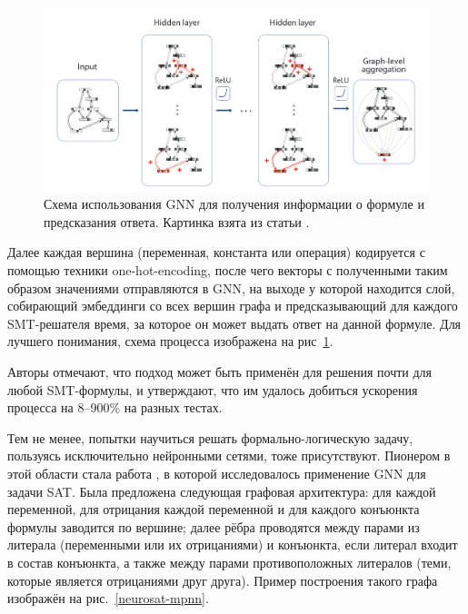 \begin{figure}[ht]
\begin{center}
    \includegraphics[scale=0.25]{./assets/gnn-for-scheduling-process.png}
    \caption{\label{gnn-for-scheduling-process} Схема использования GNN для получения информации о формуле и предсказания ответа. Картинка взята из статьи \cite{gnn-for-scheduling-paper}.}
\end{center}
\end{figure}

Далее каждая вершина (переменная, константа или операция) кодируется с помощью техники one-hot-encoding, после чего векторы с полученными таким образом значениями отправляются в GNN, на выходе у которой находится слой, собирающий эмбеддинги со всех вершин графа и предсказывающий для каждого SMT-решателя время, за которое он может выдать ответ на данной формуле. Для лучшего понимания, схема процесса изображена на рис~\ref{gnn-for-scheduling-process}.

Авторы отмечают, что подход может быть применён для решения почти для любой SMT-формулы, и утверждают, что им удалось добиться ускорения процесса на 8--900\% на разных тестах.

 \label{neurosat}

Тем не менее, попытки научиться решать формально-логическую задачу, пользуясь исключительно нейронными сетями, тоже присутствуют. Пионером в этой области стала работа \cite{neurosat-paper}, в которой исследовалось применение GNN для задачи SAT. Была предложена следующая графовая архитектура: для каждой переменной, для отрицания каждой переменной и для каждого конъюнкта формулы заводится по вершине; далее рёбра проводятся между парами из литерала (переменными или их отрицаниями) и конъюнкта, если литерал входит в состав конъюнкта, а также между парами противоположных литералов (теми, которые является отрицаниями друг друга). Пример построения такого графа изображён на рис.~\ref{neurosat-mpnn}.

